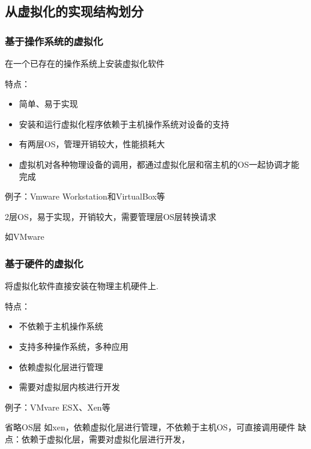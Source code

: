 \subsection{从虚拟化的实现结构划分}

\subsubsection{基于操作系统的虚拟化}
\begin{definition}[基于操作系统的虚拟化]
    在一个已存在的操作系统上安装虚拟化软件

    特点：
    
    \begin{itemize}
        \item 简单、易于实现
        \item 安装和运行虚拟化程序依赖于主机操作系统对设备的支持
        \item 有两层OS，管理开销较大，性能损耗大
        \item 虚拟机对各种物理设备的调用，都通过虚拟化层和宿主机的OS一起协调才能完成
    \end{itemize}

    例子：Vmware Workstation和VirtualBox等
\end{definition}

2层OS，易于实现，开销较大，需要管理层OS层转换请求 

如VMware

\subsubsection{基于硬件的虚拟化}

\begin{definition}[基于硬件的虚拟化]
    将虚拟化软件直接安装在物理主机硬件上. 

    特点：
    \begin{itemize}
        \item 不依赖于主机操作系统
        \item 支持多种操作系统，多种应用
        \item 依赖虚拟化层进行管理
        \item 需要对虚拟层内核进行开发
    \end{itemize}

例子：VMvare ESX、Xen等
\end{definition}

省略OS层 如xen，依赖虚拟化层进行管理，不依赖于主机OS，可直接调用硬件 缺点：依赖于虚拟化层，需要对虚拟化层进行开发， 

